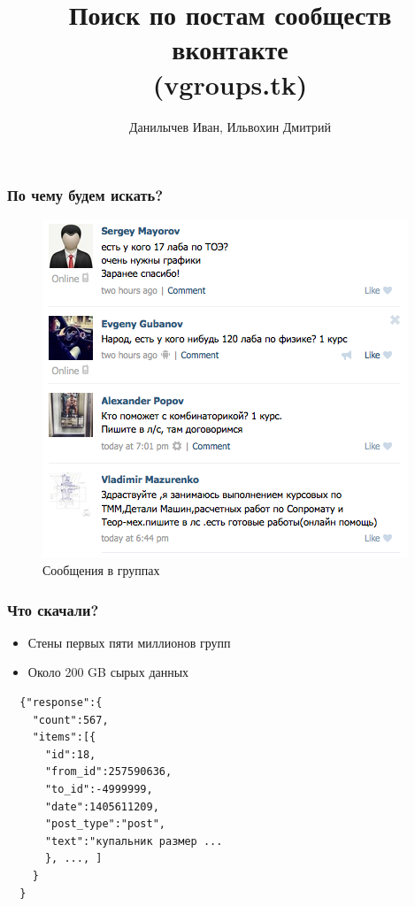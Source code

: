 \documentclass{beamer}
\title[Информационный поиск]{Поиск по постам сообществ вконтакте \\ (vgroups.tk)}
\author{Данилычев Иван, Ильвохин Дмитрий}
\institute{Московский Авиационый Институт}
\date{}
\begin{document}
\newcommand{\errorband}[5][]
{ %
\pgfplotstableread[col sep=comma, skip first n=1]{#2}\datatable
  \addplot [draw=none, stack plots=y, forget plot] table
  [
      x={#3},
      y expr=\thisrow{#4}-2*\thisrow{#5}
  ] {\datatable};

  \addplot [draw=none, fill=gray!40, stack plots=y, area legend, #1] table
  [
      x={#3},
      y expr=4*\thisrow{#5}
  ] {\datatable} \closedcycle;

  \addplot [forget plot, stack plots=y,draw=none] table [x={#3}, y expr=-(\thisrow{#4}+2*\thisrow{#5})] {\datatable};
}

\begin{frame}
  \titlepage
\end{frame}

\begin{frame}
  \frametitle{По чему будем искать?}
    \begin{figure}[!htb]
      \centering
      \includegraphics[scale=0.35]{pics/posts.png}
      \caption{Сообщения в группах}
      \label{fig:posts}
    \end{figure}
\end{frame}

\begin{frame}[fragile]
  \frametitle{Что скачали?}
  \begin{itemize}
    \item Стены первых пяти миллионов групп
    \item Около 200 GB сырых данных
  \end{itemize}

\begin{verbatim}
  {"response":{
    "count":567,
    "items":[{
      "id":18,
      "from_id":257590636,
      "to_id":-4999999,
      "date":1405611209,
      "post_type":"post",
      "text":"купальник размер ...
      }, ..., ]
    }
  }
\end{verbatim}

\end{frame}
\end{document}
